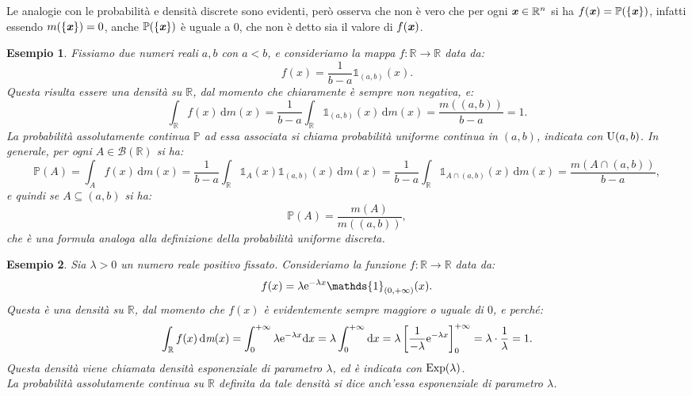 \documentclass[11pt]{book}
\theoremstyle{Definizione}
\theoremstyle{TeoremaProposizioneLemmaCorollario}
\theoremstyle{OsservazioneNota}
\newtheorem{myes}{Esempio}[section]
\newcommand{\R}{\mathbb{R}}
\newcommand{\gri}[1]{\textbf{\textit{{#1}}}}
\renewcommand{\P}{\mathbb{P}}
\newcommand{\Borel}{\mathcal{B}}
\renewcommand{\d}{\mathrm{d}}
\newcommand{\dm}{\,\d \textit{m}}
\newcommand{\Exp}{\textup{Exp}}
\newcommand{\e}{\textup{e}}
\newcommand{\uno}[1]{\mathds{1}_{#1}}
\begin{document}
Le analogie con le probabilità e densità discrete sono evidenti, però osserva che non è vero che per ogni $\gri{x}\in \R^n$ si ha $f(\gri{x}) = \P(\{\gri{x}\})$, infatti essendo $m(\{\gri{x}\}) = 0$, anche $\P(\{\gri{x}\})$ è uguale a $0$, che non è detto sia il valore di $f(\gri{x})$.
\begin{myes}
Fissiamo due numeri reali $a,b$ con $a < b$, e consideriamo la mappa $f:\R \longrightarrow \R$ data da:
$$
f(x) = \frac{1}{b-a} \uno{(a,b)}(x).
$$
Questa risulta essere una densità su $\R$, dal momento che chiaramente è sempre non negativa, e:
$$
\int_\R f(x) \dm(x) = \frac{1}{b-a}\int_\R \uno{(a,b)}(x) \dm(x) = \frac{m((a,b))}{b-a} = 1.
$$
La probabilità assolutamente continua $\P$ ad essa associata si chiama probabilità uniforme continua in $(a,b)$, indicata con $\textup{U}(a,b)$. In generale, per ogni $A\in \Borel(\R)$ si ha:
$$
\P(A) = \int_A f(x) \dm(x) = \frac{1}{b-a}\int_\R \uno{A}(x)\uno{(a,b)}(x) \dm(x) =\frac{1}{b-a} \int_\R \uno{A\cap (a,b)}(x) \dm(x) = \frac{m(A\cap (a,b))}{b-a},
$$
e quindi se $A\subseteq (a,b)$ si ha:
$$
\P(A) = \frac{m(A)}{m((a,b))},
$$
che è una formula analoga alla definizione della probabilità uniforme discreta.
\end{myes}
\begin{myes}
Sia $\lambda > 0$ un numero reale positivo fissato. Consideriamo la funzione $f:\R\longrightarrow \R$ data da:
$$
f(x) = \lambda \e^{-\lambda x} \uno{(0,+\infty)}(x).
$$
Questa è una densità su $\R$, dal momento che $f(x)$ è evidentemente sempre maggiore o uguale di $0$, e perché:
$$
\int_\R f(x) \dm(x) = \int_{0}^{+\infty} \lambda \e^{-\lambda x} \d x = \lambda \int_{0}^{+\infty} \d x = \lambda \left[\frac{1}{-\lambda}\e^{-\lambda x}\right]_{0}^{+\infty} = \lambda \cdot \frac{1}{\lambda} = 1.
$$
Questa densità viene chiamata densità esponenziale di parametro $\lambda$, ed è indicata con $\Exp(\lambda)$.\\
La probabilità assolutamente continua su $\R$ definita da tale densità si dice anch'essa esponenziale di parametro $\lambda$.
\end{myes}
\end{document}
